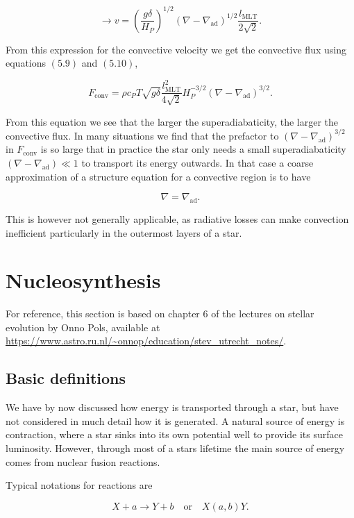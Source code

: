 \documentclass[twocolumn]{article}
\begin{document}
\[\rightarrow v=\left(\frac{g\delta}{H_P}\right)^{1/2}(\nabla-\nabla_\mathrm{ad})^{1/2}\frac{l_\mathrm{MLT}}{2\sqrt{2}}.\]

From this expression for the convective velocity we get the convective
flux using equations \((5.9)\) and \((5.10)\),

\[\boxed{F_\mathrm{conv}=\rho c_P T \sqrt{g\delta} \frac{l_\mathrm{MLT}^2}{4\sqrt{2}}H_P^{-3/2}(\nabla-\nabla_\mathrm{ad})^{3/2}.}\]

From this equation we see that the larger the superadiabaticity, the
larger the convective flux. In many situations we find that the
prefactor to \((\nabla-\nabla_\mathrm{ad})^{3/2}\) in
\(F_\mathrm{conv}\) is so large that in practice the star only needs a
small superadiabaticity \((\nabla-\nabla_\mathrm{ad})\ll 1\) to
transport its energy outwards. In that case a coarse approximation of a
structure equation for a convective region is to have

\[\nabla = \nabla_\mathrm{ad}.\]

This is however not generally applicable, as radiative losses can make
convection inefficient particularly in the outermost layers of a star.

\hypertarget{nucleosynthesis}{%
\section{Nucleosynthesis}\label{nucleosynthesis}}

For reference, this section is based on chapter 6 of the lectures on
stellar evolution by Onno Pols, available at
\url{https://www.astro.ru.nl/~onnop/education/stev_utrecht_notes/}.

\hypertarget{basic-definitions}{%
\subsection{Basic definitions}\label{basic-definitions}}

We have by now discussed how energy is transported through a star, but
have not considered in much detail how it is generated. A natural source
of energy is contraction, where a star sinks into its own potential well
to provide its surface luminosity. However, through most of a stars
lifetime the main source of energy comes from nuclear fusion reactions.

Typical notations for reactions are

\[X+a\rightarrow Y+b\quad \text{or} \quad X(a,b)Y.\]
\end{document}

